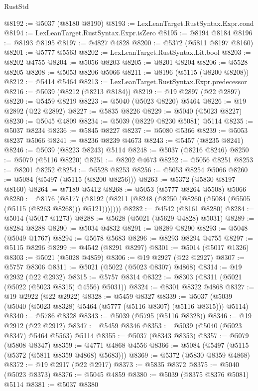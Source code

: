 \begin{lexlean}{RustStd}
\begin{coremodule}
@8192 := @5037 (@8180 @8190)
@8193 := LexLeanTarget.RustSyntax.Expr.cond
@8194 := LexLeanTarget.RustSyntax.Expr.isZero
@8195 := @8194 @8184
@8196 := @8193 @8195
@8197 := @4827 @4828
@8200 := @5372 (@5811 @8197 @8160)
@8201 := @5777 @5563
@8202 := LexLeanTarget.RustSyntax.Lit.bool
@8203 := @8202 @4755
@8204 := @5056 @8203
@8205 := @8201 @8204
@8206 := @5528 @8205
@8208 := @5053 @8206 @5066
@8211 := @8196 (@5115 (@8200 @8208))
@8212 := @5414 @5464
@8213 := LexLeanTarget.RustSyntax.Expr.predecessor
@8216 := @5039 (@8212 (@8213 @8184))
@8219 := @19 @2897 (@22 @2897)
@8220 := @5459 @8219
@8223 := @5040 (@5023 @8220) @5464
@8226 := @19 @2892 (@22 @2892)
@8227 := @5835 @8226
@8229 := @5040 (@5023 @8227)
@8230 := @5045 @4809
@8234 := @5039 (@8229 @8230 @5081) @5114
@8235 := @5037 @8234
@8236 := @5845 @8227
@8237 := @5080 @5366
@8239 := @5053 @8237 @5066
@8241 := @8236 @8239 @4673
@8243 := @5457 (@8235 @8241)
@8246 := @5039 (@8223 @8243) @5114
@8248 := @5037 (@8216 @8246)
@8250 := @5079 (@5116 @8220)
@8251 := @8202 @4673
@8252 := @5056 @8251
@8253 := @8201 @8252
@8254 := @5528 @8253
@8256 := @5053 @8254 @5066
@8260 := @5084 (@5497 (@5115 (@8200 @8256)))
@8263 := @5372 (@5830 @8197 @8160)
@8264 := @7189 @5412
@8268 := @5053 (@5777 @8264 @5508) @5066
@8280 := @8176
    (@8177 (@8192 (@8211 (@8248 (@8250 (@8260 (@5084 (@5505 (@5115 (@8263 @8268))) @5121)))))))
@8282 := @4542 (@8161 @8280)
@8284 := @5014 (@5017 @1273)
@8288 := @5628 (@5021 (@5629 @4828) @5031)
@8289 := @8284 @8288
@8290 := @5034 @4832
@8291 := @8289 @8290
@8293 := @5048 (@5049 @1767)
@8294 := @5678 @5683
@8296 := @8293 @8294 @4755
@8297 := @5115 @8296
@8299 := @4542 (@8291 @8297)
@8301 := @5014 (@5017 @1326)
@8303 := @5021 (@5028 @4859)
@8306 := @19 @2927 (@22 @2927)
@8307 := @5757 @8306
@8311 := @5021 (@5022 (@5023 @8307) @4868)
@8314 := @19 @2932 (@22 @2932)
@8315 := @5757 @8314
@8322 := @8303 (@8311 (@5021 (@5022 (@5023 @8315) @4556) @5031))
@8324 := @8301 @8322 @4868
@8327 := @19 @2922 (@22 @2922)
@8328 := @5459 @8327
@8339 := @5037 (@5039 (@5040 (@5023 @8328) @5464 (@5777 (@5116 @8307) (@5116 @8315))) @5114)
@8340 := @5786 @8328
@8343 := @5039 (@5795 (@5116 @8328))
@8346 := @19 @2912 (@22 @2912)
@8347 := @5459 @8346
@8353 := @5039 (@5040 (@5023 @8347) @5464 @5563) @5114
@8355 := @5037 (@8343 @8353)
@8357 := @5079 (@5808 @8347)
@8359 := @4771 @4868 @4556
@8366 := @5084 (@5497 (@5115 (@5372 (@5811 @8359 @4868) @5683)))
@8369 := @5372 (@5830 @8359 @4868)
@8372 := @19 @2917 (@22 @2917)
@8373 := @5835 @8372
@8375 := @5040 (@5023 @8373)
@8376 := @5045 @4859
@8380 := @5039 (@8375 @8376 @5081) @5114
@8381 := @5037 @8380

\end{coremodule}
\end{lexlean}
